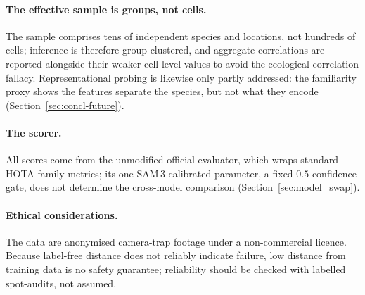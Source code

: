 \paragraph{The effective sample is groups, not cells.} The sample comprises tens of independent species and
locations, not hundreds of cells; inference is therefore group-clustered, and aggregate correlations are
reported alongside their weaker cell-level values to avoid the ecological-correlation fallacy. Representational probing is likewise only partly addressed: the familiarity proxy shows the
features separate the species, but not what they encode (Section~\ref{sec:concl-future}).

\paragraph{The scorer.} All scores come from the unmodified official evaluator, which wraps standard
HOTA-family metrics; its one SAM\,3-calibrated parameter, a fixed $0.5$ confidence gate, does not determine
the cross-model comparison (Section~\ref{sec:model_swap}).

\paragraph{Ethical considerations.}
The data are anonymised camera-trap footage under a non-commercial licence.
Because label-free distance does not reliably indicate failure, low distance from training data is no safety
guarantee; reliability should be checked with labelled spot-audits, not assumed.
